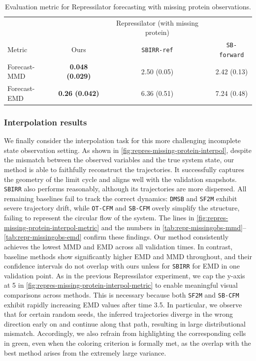 \begin{table}[!ht]
    \centering
    \caption{Evaluation metric for Repressilator forecasting with missing protein observations.}
    \begin{tabular}{lccc}
    \hline
    &     & Repressilator (with missing protein) & \\
    Metric     &  Ours & \texttt{SBIRR-ref} & \texttt{SB-forward} \\
    \hline 
    Forecast-MMD & \cellcolor{green!25}\textbf{0.048 (0.029)}& 2.50 (0.05) & 2.42  (0.13) \\
    Forecast-EMD & \cellcolor{green!25}\textbf{0.26 (0.042)}& 6.36 (0.51) & 7.24  (0.48) \\
    \hline
    \end{tabular}
    \label{tab:mlp_repres_missing}
\end{table}

\subsubsection{Interpolation results}
\label{app:repr-missing-interpol}

We finally consider the interpolation task for this more challenging incomplete state observation setting. As shown in \cref{fig:repres-missing-protein-interpol}, despite the mismatch between the observed variables and the true system state, our method is able to faithfully reconstruct the trajectories. It successfully captures the geometry of the limit cycle and aligns well with the validation snapshots. \texttt{SBIRR} also performs reasonably, although its trajectories are more dispersed. All remaining baselines fail to track the correct dynamics: \texttt{DMSB}  and \texttt{SF2M}  exhibit severe trajectory drift, while \texttt{OT-CFM}  and \texttt{SB-CFM}  overly simplify the structure, failing to represent the circular flow of the system.
The lines in \cref{fig:repres-missing-protein-interpol-metric} and the numbers in \cref{tab:repr-missingobs-mmd}–\cref{tab:repr-missingobs-emd} confirm these findings. Our method consistently achieves the lowest MMD and EMD across all validation times. In contrast, baseline methods show significantly higher EMD and MMD throughout, and their confidence intervals do not overlap with ours unless for \texttt{SBIRR} for EMD in one validation point. As in the previous Repressilator experiment, we cap the y-axis at 5 in \cref{fig:repres-missing-protein-interpol-metric} to enable meaningful visual comparisons across methods. This is necessary because both \texttt{SF2M}  and \texttt{SB-CFM}  exhibit rapidly increasing EMD values after time 3.5. In particular, we observe that for certain random seeds, the inferred trajectories diverge in the wrong direction early on and continue along that path, resulting in large distributional mismatch. Accordingly, we also refrain from highlighting the corresponding cells in green, even when the coloring criterion is formally met, as the overlap with the best method arises from the extremely large variance.

